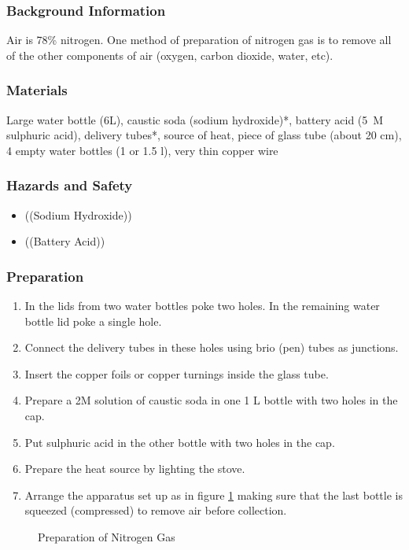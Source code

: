 \subsubsection*{Background Information}
Air is 78\% nitrogen. One method of preparation of nitrogen gas is to remove all of the other components of air (oxygen, carbon dioxide, water, etc).

\subsubsection*{Materials}
Large water bottle (6L), caustic soda (sodium hydroxide)*, battery acid (5~M sulphuric acid), delivery tubes*, source of heat, piece of glass tube (about 20 cm), 4 empty water bottles (1 or 1.5 l), very thin copper wire

\subsubsection*{Hazards and Safety}
\begin{itemize}
\item{((Sodium Hydroxide))}
\item{((Battery Acid))}
\end{itemize}

\subsubsection*{Preparation}
\begin{enumerate}
\item{In the lids from two water bottles poke two holes. In the remaining water bottle lid poke a single hole.}
\item{Connect the delivery tubes in these holes using brio (pen) tubes as junctions.}
\item{Insert the copper foils or copper turnings inside the glass tube.}
\item{Prepare a 2M solution of caustic soda in one 1 L bottle with two holes in the cap.}
\item{Put sulphuric acid in the other bottle with two holes in the cap.}
\item{Prepare the heat source by lighting the stove.}
\item{Arrange the apparatus set up as in figure \ref{fig:nitrogen-prep} making sure that the last bottle is squeezed (compressed) to remove air before collection.}
\end{enumerate}

\begin{figure}[h]
\begin{center}
\def\svgwidth{400pt}

\caption{Preparation of Nitrogen Gas}
\label{fig:nitrogen-prep}
\end{center}
\end{figure}

